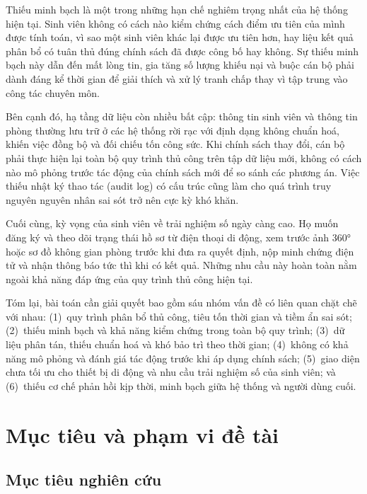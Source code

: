 ﻿\documentclass[a4paper,12pt,openany,oneside]{report}
\begin{document}
Thiếu minh bạch là một trong những hạn chế nghiêm trọng nhất của hệ thống hiện
tại. Sinh viên không có cách nào kiểm chứng cách điểm ưu tiên của mình được
tính toán, vì sao một sinh viên khác lại được ưu tiên hơn, hay liệu kết quả phân
bổ có tuân thủ đúng chính sách đã được công bố hay không. Sự thiếu minh bạch
này dẫn đến mất lòng tin, gia tăng số lượng khiếu nại và buộc cán bộ phải dành
đáng kể thời gian để giải thích và xử lý tranh chấp thay vì tập trung vào công
tác chuyên môn.

Bên cạnh đó, hạ tầng dữ liệu còn nhiều bất cập: thông tin sinh viên và thông
tin phòng thường lưu trữ ở các hệ thống rời rạc với định dạng không chuẩn hoá,
khiến việc đồng bộ và đối chiếu tốn công sức. Khi chính sách thay đổi, cán bộ
phải thực hiện lại toàn bộ quy trình thủ công trên tập dữ liệu mới, không có
cách nào mô phỏng trước tác động của chính sách mới để so sánh các phương án.
Việc thiếu nhật ký thao tác (audit log) có cấu trúc cũng làm cho quá trình truy
nguyên nguyên nhân sai sót trở nên cực kỳ khó khăn.

Cuối cùng, kỳ vọng của sinh viên về trải nghiệm số ngày càng cao. Họ muốn đăng
ký và theo dõi trạng thái hồ sơ từ điện thoại di động, xem trước ảnh 360° hoặc
sơ đồ không gian phòng trước khi đưa ra quyết định, nộp minh chứng điện tử và
nhận thông báo tức thì khi có kết quả. Những nhu cầu này hoàn toàn nằm ngoài
khả năng đáp ứng của quy trình thủ công hiện tại.

Tóm lại, bài toán cần giải quyết bao gồm sáu nhóm vấn đề có liên quan chặt chẽ
với nhau: (1)~quy trình phân bổ thủ công, tiêu tốn thời gian và tiềm ẩn sai sót;
(2)~thiếu minh bạch và khả năng kiểm chứng trong toàn bộ quy trình; (3)~dữ liệu
phân tán, thiếu chuẩn hoá và khó bảo trì theo thời gian; (4)~không có khả năng
mô phỏng và đánh giá tác động trước khi áp dụng chính sách; (5)~giao diện chưa
tối ưu cho thiết bị di động và nhu cầu trải nghiệm số của sinh viên; và
(6)~thiếu cơ chế phản hồi kịp thời, minh bạch giữa hệ thống và người dùng cuối.

\section{Mục tiêu và phạm vi đề tài}

\subsection{Mục tiêu nghiên cứu}
\end{document}

